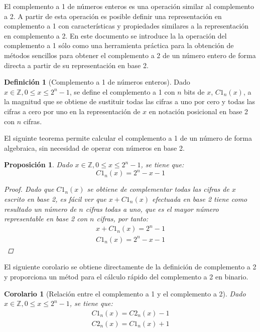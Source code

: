 \documentclass[spanish,a4paper,12pt,titlepage]{article}
\newtheorem{proposition}[theorem]{Proposición}
\newtheorem{corollary}[theorem]{Corolario}
\theoremstyle{definition}
\newtheorem{definition}{Definición}%
\theoremstyle{remark}
\newcommand{\bbZ}{\mathbb{Z}}
\begin{document}
El complemento a 1 de números enteros es una operación similar al complemento a 2. A partir de esta operación es posible definir una representación en complemento a 1 con características y propiedades similares a la representación en complemento a 2. En este documento se introduce la la operación del complemento a 1 sólo como una herramienta práctica para la obtención de métodos sencillos para obtener el complemento a 2 de un número entero de forma directa a partir de su representación en base 2.

\begin{definition}[Complemento a 1 de números enteros]\label{def-c1}
    Dado $x \in \bbZ, 0 \le x \le 2^n-1$, se define el complemento a 1 con $n$ bits de $x$, $C1_n(x)$, a la magnitud que se obtiene de sustituir todas las cifras a uno por cero y todas las cifras a cero por uno en la representación de $x$ en notación posicional en base 2 con $n$ cifras.
\end{definition}

El siguinte teorema permite calcular el complemento a 1 de un número de forma algebraica, sin necesidad de operar con números en base 2.

\begin{proposition}
    Dado $x \in \bbZ, 0 \le x \le 2^n-1$, se tiene que:
    \[
        C1_n(x) = 2^n - x - 1
    \]
    \begin{proof}
        Dado que $C1_n(x)$ se obtiene de complementar todas las cifras de $x$ escrito en base 2, es fácil ver que $x+C1_n(x)$ efectuada en base 2 tiene como resultado un número de $n$ cifras todas a uno, que es el mayor número representable en base 2 con $n$ cifras, por tanto:
        \begin{align*}
            x + C1_n(x) = 2^n - 1\\
            C1_n(x) = 2^n - x - 1
        \end{align*}
    \end{proof}
\end{proposition}

El siguiente corolario se obtiene directamente de la definición de complemento a 2 y proporciona un métod para el cálculo rápido del complemento a 2 en binario.

\begin{corollary}[Relación entre el complemento a 1 y el complemento a 2]\label{c1-c2-relation}
    Dado $x \in \bbZ, 0 \le x \le 2^n-1$, se tiene que:
    \begin{align*}
        C1_n(x) = C2_n(x) - 1\\
        C2_n(x) = C1_n(x) + 1
    \end{align*}
\end{corollary}
\end{document}
